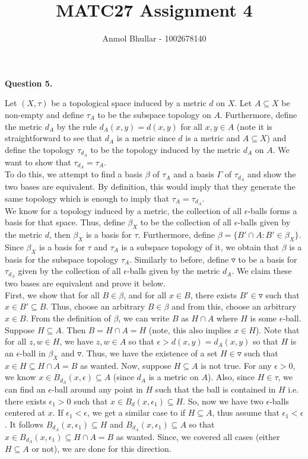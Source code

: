 \documentclass{article}
\title{MATC27 Assignment 4}
\author{Anmol Bhullar - 1002678140}
\begin{document}
    \textbf{Question 5.}

    Let $(X,\tau)$ be a topological space induced by a metric $d$ on $X$. Let $A\subseteq X$ be non-empty and define $\tau_A$ to be the subspace topology 
    on $A$. Furthermore, define the metric $d_A$ by the rule $d_A(x,y) = d(x,y)$ for all $x,y\in A$ (note it is straightforward to see that $d_A$ is a metric
    since $d$ is a metric and $A\subseteq X$) and define the topology $\tau_{d_A}$ to be the topology induced by the metric $d_A$ on $A$. We want to show that
    $\tau_{d_A} = \tau_A$.\\

    To do this, we attempt to find a basis $\beta$ of $\tau_A$ and a basis $\Gamma$ of $\tau_{d_A}$ and show the two bases are equivalent. By definition, this
    would imply that they generate the same topology which is enough to imply that $\tau_A = \tau_{d_A}$.\\

    We know for a topology induced by a metric, the collection of all $\epsilon$-balls forms a basis for that space. Thus, define $\beta_X$ to be the collection
    of all $\epsilon$-balls given by the metric $d$, then $\beta_X$ is a basis for $\tau$. Furthermore, define $\beta = \{B' \cap A: B'\in\beta_X\}$. Since
    $\beta_X$ is a basis for $\tau$ and $\tau_A$ is a subspace topology of it, we obtain that $\beta$ is a basis for the subspace topology $\tau_A$. Similarly to before,
    define $\triangledown$ to be a basis for $\tau_{d_A}$ given by the collection of all $\epsilon$-balls given by the metric $d_A$. We claim these two bases are 
    equivalent and prove it below.\\

    First, we show that for all $B\in\beta$, and for all $x\in B$, there exists $B'\in\triangledown$ such that $x\in B'\subseteq B$. Thus, choose an arbitrary
    $B\in\beta$ and from this, choose an arbitrary $x\in B$. From the definition of $\beta$, we can write $B$ as $H \cap A$ where $H$ is some $\epsilon$-ball.
    Suppose $H\subseteq A$. Then $B = H \cap A = H$ (note, this also implies $x\in H$). 
    Note that for all $z,w\in H$, we have $z,w\in A$ so that $\epsilon > d(x,y) = d_A(x,y)$ so that
    $H$ is an $\epsilon$-ball in $\beta_X$ and $\triangledown$. Thus, we have the existence of a set $H\in\triangledown$ such that $x\in H\subseteq H \cap A = B$ 
    as wanted. Now, suppose $H\subseteq A$ is not true. For any $\epsilon > 0$, we know $x\in B_{d_A}(x,\epsilon)\subseteq A$ (since $d_A$ is a metric on $A$).
    Also, since $H\in\tau$, we can find an $\epsilon$-ball around any point in $H$ such that the ball is contained in $H$ i.e. there exists $\epsilon_1>0$ such that
    $x\in B_d(x,\epsilon_1)\subseteq H$. So, now we have two $\epsilon$-balls centered at $x$. If $\epsilon_1 < \epsilon$, we get a similar case to if $H\subseteq A$,
    thus assume that $\epsilon_1 < \epsilon$. It follows $B_{d_A}(x,\epsilon_1)\subseteq H$ and $B_{d_A}(x,\epsilon_1)\subseteq A$ so that $x\in B_{d_A}(x,\epsilon_1)
    \subseteq H \cap A = B$ as wanted. Since, we covered all cases (either $H\subseteq A$ or not), we are done for this direction.\\
    
\end{document}
